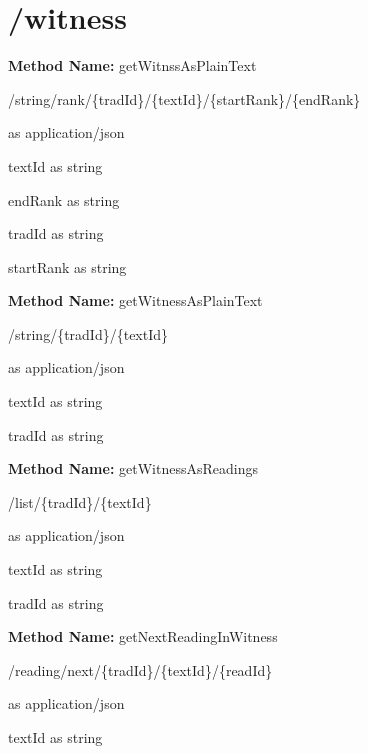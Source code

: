 \section{/witness}
\textbf{Method Name: }getWitnssAsPlainText
\begin{get}
/string/rank/\{tradId\}/\{textId\}/\{startRank\}/\{endRank\}
\end{get}
\begin{response}
 as application/json
\end{response}
\begin{parameter}
textId as string
\end{parameter}
\begin{parameter}
endRank as string
\end{parameter}
\begin{parameter}
tradId as string
\end{parameter}
\begin{parameter}
startRank as string
\end{parameter}
\textbf{Method Name: }getWitnessAsPlainText
\begin{get}
/string/\{tradId\}/\{textId\}
\end{get}
\begin{response}
 as application/json
\end{response}
\begin{parameter}
textId as string
\end{parameter}
\begin{parameter}
tradId as string
\end{parameter}
\textbf{Method Name: }getWitnessAsReadings
\begin{get}
/list/\{tradId\}/\{textId\}
\end{get}
\begin{response}
 as application/json
\end{response}
\begin{parameter}
textId as string
\end{parameter}
\begin{parameter}
tradId as string
\end{parameter}
\textbf{Method Name: }getNextReadingInWitness
\begin{get}
/reading/next/\{tradId\}/\{textId\}/\{readId\}
\end{get}
\begin{response}
 as application/json
\end{response}
\begin{parameter}
textId as string
\end{parameter}
